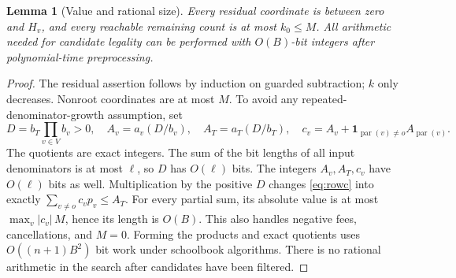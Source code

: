 \documentclass[11pt,a4paper]{article}
\newtheorem{lemma}[theorem]{Lemma}
\theoremstyle{definition}
\theoremstyle{remark}
\newcommand{\pa}{\operatorname{par}}
\begin{document}
\begin{lemma}[Value and rational size]\label{lem:bits}
Every residual coordinate is between zero and \(H_v\), and every reachable
remaining count is at most \(k_0\le M\). All arithmetic needed for candidate
legality can be performed with \(O(B)\)-bit integers after polynomial-time
preprocessing.
\end{lemma}
\begin{proof}
The residual assertion follows by induction on guarded subtraction;
\(k\) only decreases. Nonroot coordinates are at most \(M\).
To avoid any repeated-denominator-growth assumption, set
\[
 D=b_T\prod_{v\in V}b_v>0,\quad
 A_v=a_v(D/b_v),\quad A_T=a_T(D/b_T),\quad
 c_v=A_v+\mathbf1_{\pa(v)\ne o}A_{\pa(v)}.
\]
The quotients are exact integers. The sum of the bit lengths of all input
denominators is at most \(\ell\), so \(D\) has \(O(\ell)\) bits. The
integers \(A_v,A_T,c_v\) have \(O(\ell)\) bits as well. Multiplication
by the positive \(D\) changes \eqref{eq:rowc} into exactly
\(\sum_{v\ne o}c_vp_v\le A_T\). For every partial sum, its absolute
value is at most \(\max_v|c_v|\,M\), hence its length is \(O(B)\).
This also handles negative fees, cancellations, and \(M=0\).
Forming the products and exact quotients uses \(O((n+1)B^2)\) bit work
under schoolbook algorithms. There is no rational arithmetic in the search
after candidates have been filtered.
\end{proof}
\end{document}
